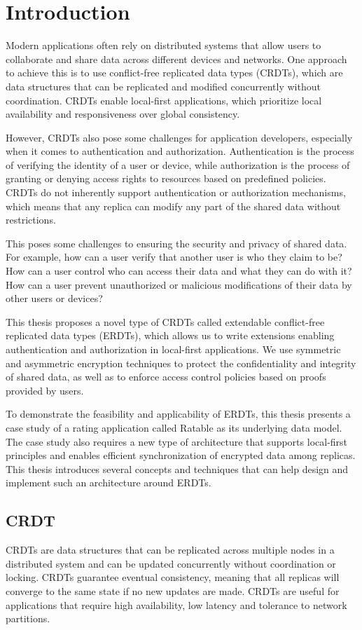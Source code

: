 \documentclass[
	english,
	ruledheaders=section,   %
	class=report,		    %
	thesis={type=bachelor}, %
	accentcolor=9c,			%
	custommargins=true,    %
	marginpar=false,        %
	parskip=half-,          %
	fontsize=11pt,          %
]{tudapub}
\begin{document}
\chapter{Introduction}
Modern applications often rely on distributed systems that allow users to collaborate and share data across different devices and networks. One approach to achieve this is to use conflict-free replicated data types (CRDTs), which are data structures that can be replicated and modified concurrently without coordination. CRDTs enable local-first applications, which prioritize local availability and responsiveness over global consistency.

However, CRDTs also pose some challenges for application developers, especially when it comes to authentication and authorization. Authentication is the process of verifying the identity of a user or device, while authorization is the process of granting or denying access rights to resources based on predefined policies. CRDTs do not inherently support authentication or authorization mechanisms, which means that any replica can modify any part of the shared data without restrictions.

This poses some challenges to ensuring the security and privacy of shared data. For example, how can a user verify that another user is who they claim to be? How can a user control who can access their data and what they can do with it? How can a user prevent unauthorized or malicious modifications of their data by other users or devices?

This thesis proposes a novel type of CRDTs called extendable conflict-free replicated data types (ERDTs), which allows us to write extensions enabling authentication and authorization in local-first applications. We use symmetric and asymmetric encryption techniques to protect the confidentiality and integrity of shared data, as well as to enforce access control policies based on proofs provided by users. 

To demonstrate the feasibility and applicability of ERDTs, this thesis presents a case study of a rating application called Ratable as its underlying data model. The case study also requires a new type of architecture that supports local-first principles and enables efficient synchronization of encrypted data among replicas. This thesis introduces several concepts and techniques that can help design and implement such an architecture around ERDTs.

\section{CRDT}
CRDTs are data structures that can be replicated across multiple nodes in a distributed system and can be updated concurrently without coordination or locking. CRDTs guarantee eventual consistency, meaning that all replicas will converge to the same state if no new updates are made. CRDTs are useful for applications that require high availability, low latency and tolerance to network partitions.
\end{document}

